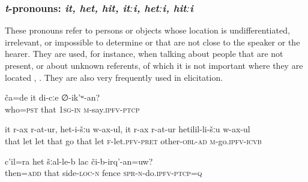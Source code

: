 
\subsubsection{\textit{t}-pronouns: \textit{it, het, hit, itːi, hetːi, hitːi}}
\label{sssec:t-pronouns}

These pronouns refer to persons or objects whose location is undifferentiated, irrelevant, or impossible to determine or that are not close to the speaker or the hearer. They are used, for instance, when talking about people that are not present, or about unknown referents, of which it is not important where they are located , . They are also very frequently used in elicitation.

\begin{exe}
	\ex	\label{Who was that (masc.) who told me that}
	\gll	ča=de	it	di-cːe	∅-ik'ʷ-an?\\
		who=\textsc{pst}	that	\textsc{1sg-in}	\textsc{m}-say.\textsc{ipfv-ptcp}\\
	\glt	{}

		\label{He left her and went to that, he left her and when to the next.}
	\sn
	\gll	it	r-ax	r-at-ur,	het-i-šːu	w-ax-ul,	it	r-ax	r-at-ur	hetilil-li-šːu	w-ax-ul\\
		that	\tsc{f-}let	let	that	go	that	let	\textsc{f}-let.\textsc{pfv}-\textsc{pret}	other-\textsc{obl-ad}	\textsc{m}-go.\textsc{ipfv}-\textsc{icvb}\\
	\glt	{}

		\label{talking about a stone fence that the speaker is building; both speaker} 
	\sn
	\gll	c'il=ra	het	šːal-le-b	lac	či-b-irq'-an=uw?\\	
		then=\textsc{add}	that	side-\textsc{loc}-\textsc{n}	fence	\textsc{spr}-\textsc{n}-do.\textsc{ipfv}-\textsc{ptcp}=\textsc{q} \\
	\glt	{}
\end{exe}

